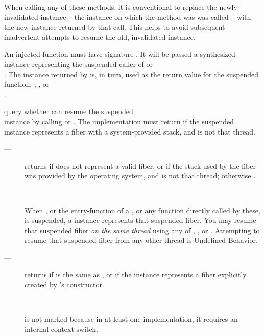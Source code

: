 When calling any of these methods, it is conventional to replace the
newly-invalidated instance -- the instance on which the method was was called
-- with the new instance returned by that call. This helps to avoid subsequent
inadvertent attempts to resume the old, invalidated instance.

An injected function  must have signature
.
It will be passed a synthesized \fiber instance representing
the suspended caller of \resumewith or\\
\xtresumewith. The \fiber instance returned by  is, in turn, used as
the return value for the suspended function: \resume, \resumewith, \xtresume
or\\\xtresumewith.


\effects
query whether \currthread can resume the suspended\\
\fiber instance by
calling \xtresume or \xtresumewith. The implementation must return 
if the suspended \fiber instance represents a fiber with a system-provided
stack, and \currthread is not that thread.\\

\returns
\begin{description}
    \item[---]  returns 
        if  does not represent a valid fiber, or
        if the stack used by the fiber was provided by the operating system,
        and \currthread is not that thread; otherwise .
\end{description}

\remarks
\begin{description}
    \item[---] When \main, or the entry-function of a \thread, or any function
        directly called by these, is suspended, a \fiber instance represents that
        suspended fiber. You may resume that suspended fiber \emph{on the same thread}
        using any of \resume, \resumewith, \xtresume or \xtresumewith. Attempting to
        resume that suspended fiber from any other thread is Undefined Behavior.
    \item[---] \canxtresume returns  if \currthread is the same as \lastthread,
        or if the \fiber instance
        represents a fiber explicitly created by \fiber's constructor.
    \item[---] \canxtresume is not marked  because in at least one
        implementation, it requires an internal context switch.
\end{description}

